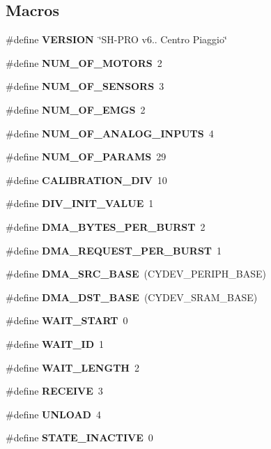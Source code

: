 \subsection*{Macros}
\begin{DoxyCompactItemize}
\item 
\mbox{\label{globals_8h_a1c6d5de492ac61ad29aec7aa9a436bbf}} 
\#define {\bfseries V\+E\+R\+S\+I\+ON}~\char`\"{}SH-\/P\+RO v6.. Centro Piaggio\char`\"{}
\item 
\#define \textbf{ N\+U\+M\+\_\+\+O\+F\+\_\+\+M\+O\+T\+O\+RS}~2
\item 
\#define \textbf{ N\+U\+M\+\_\+\+O\+F\+\_\+\+S\+E\+N\+S\+O\+RS}~3
\item 
\#define \textbf{ N\+U\+M\+\_\+\+O\+F\+\_\+\+E\+M\+GS}~2
\item 
\#define \textbf{ N\+U\+M\+\_\+\+O\+F\+\_\+\+A\+N\+A\+L\+O\+G\+\_\+\+I\+N\+P\+U\+TS}~4
\item 
\#define \textbf{ N\+U\+M\+\_\+\+O\+F\+\_\+\+P\+A\+R\+A\+MS}~29
\item 
\#define \textbf{ C\+A\+L\+I\+B\+R\+A\+T\+I\+O\+N\+\_\+\+D\+IV}~10
\item 
\#define \textbf{ D\+I\+V\+\_\+\+I\+N\+I\+T\+\_\+\+V\+A\+L\+UE}~1
\item 
\mbox{\label{globals_8h_abf6c9afec04b86961e177e0646401ace}} 
\#define {\bfseries D\+M\+A\+\_\+\+B\+Y\+T\+E\+S\+\_\+\+P\+E\+R\+\_\+\+B\+U\+R\+ST}~2
\item 
\mbox{\label{globals_8h_ab4613f8bee68bc68fa6fe94a3ae6d568}} 
\#define {\bfseries D\+M\+A\+\_\+\+R\+E\+Q\+U\+E\+S\+T\+\_\+\+P\+E\+R\+\_\+\+B\+U\+R\+ST}~1
\item 
\mbox{\label{globals_8h_a3cc2eedb40809a1f15ad841c8abbcebf}} 
\#define {\bfseries D\+M\+A\+\_\+\+S\+R\+C\+\_\+\+B\+A\+SE}~(C\+Y\+D\+E\+V\+\_\+\+P\+E\+R\+I\+P\+H\+\_\+\+B\+A\+SE)
\item 
\mbox{\label{globals_8h_aa54e301f446a66cbf8c943d920c8e967}} 
\#define {\bfseries D\+M\+A\+\_\+\+D\+S\+T\+\_\+\+B\+A\+SE}~(C\+Y\+D\+E\+V\+\_\+\+S\+R\+A\+M\+\_\+\+B\+A\+SE)
\item 
\#define \textbf{ W\+A\+I\+T\+\_\+\+S\+T\+A\+RT}~0
\item 
\#define \textbf{ W\+A\+I\+T\+\_\+\+ID}~1
\item 
\#define \textbf{ W\+A\+I\+T\+\_\+\+L\+E\+N\+G\+TH}~2
\item 
\#define \textbf{ R\+E\+C\+E\+I\+VE}~3
\item 
\#define \textbf{ U\+N\+L\+O\+AD}~4
\item 
\#define \textbf{ S\+T\+A\+T\+E\+\_\+\+I\+N\+A\+C\+T\+I\+VE}~0

\end{DoxyCompactItemize}
